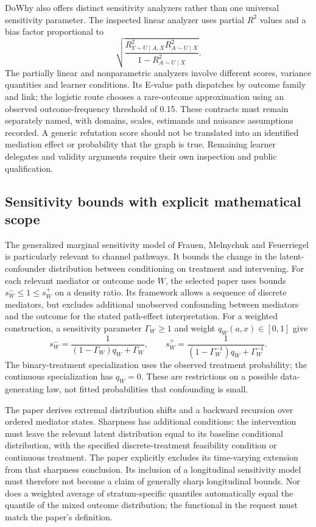 DoWhy also offers distinct sensitivity analyzers rather than one universal sensitivity parameter. The inspected linear analyzer uses partial $R^2$ values and a bias factor proportional to
\[
 \sqrt{\frac{R^2_{Y\sim U\mid A,X}R^2_{A\sim U\mid X}}
 {1-R^2_{A\sim U\mid X}}}.
\]
The partially linear and nonparametric analyzers involve different scores, variance quantities and learner conditions. Its E-value path dispatches by outcome family and link; the logistic route chooses a rare-outcome approximation using an observed outcome-frequency threshold of 0.15. These contracts must remain separately named, with domains, scales, estimands and nuisance assumptions recorded. A generic refutation score should not be translated into an identified mediation effect or probability that the graph is true. Remaining learner delegates and validity arguments require their own inspection and public qualification. \citep{exec25_pymed_dowhy,exec25_pymed_choice}

\subsection{Sensitivity bounds with explicit mathematical scope}
The generalized marginal sensitivity model of Frauen, Melnychuk and Feuerriegel is particularly relevant to channel pathways. It bounds the change in the latent-confounder distribution between conditioning on treatment and intervening. For each relevant mediator or outcome node $W$, the selected paper uses bounds $s_W^-\leq1\leq s_W^+$ on a density ratio. Its framework allows a sequence of discrete mediators, but excludes additional unobserved confounding between mediators and the outcome for the stated path-effect interpretation. For a weighted construction, a sensitivity parameter $\Gamma_W\geq1$ and weight $q_W(a,x)\in[0,1]$ give
\[
 s_W^-=\frac{1}{(1-\Gamma_W)q_W+\Gamma_W},\qquad
 s_W^+=\frac{1}{(1-\Gamma_W^{-1})q_W+\Gamma_W^{-1}}.
\]
The binary-treatment specialization uses the observed treatment probability; the continuous specialization has $q_W=0$. These are restrictions on a possible data-generating law, not fitted probabilities that confounding is small. \citep{exec25_pymed_sharp_paper}

The paper derives extremal distribution shifts and a backward recursion over ordered mediator states. Sharpness has additional conditions: the intervention must leave the relevant latent distribution equal to its baseline conditional distribution, with the specified discrete-treatment feasibility condition or continuous treatment. The paper explicitly excludes its time-varying extension from that sharpness conclusion. Its inclusion of a longitudinal sensitivity model must therefore not become a claim of generally sharp longitudinal bounds. Nor does a weighted average of stratum-specific quantiles automatically equal the quantile of the mixed outcome distribution; the functional in the request must match the paper's definition. \citep{exec25_pymed_sharp_paper}

